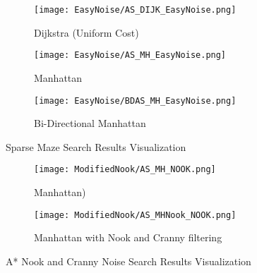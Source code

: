 \documentclass[conference]{IEEEtran}
\begin{document}
\begin{figure*}[h]
    \centering
    \begin{subfigure}{.29\textwidth}
        \texttt{[image: EasyNoise/AS\_DIJK\_EasyNoise.png]}
        \caption{Dijkstra (Uniform Cost)}
        \label{fig:EN_DIJK}
    \end{subfigure} \hfill
    \begin{subfigure}{.29\textwidth}
        \texttt{[image: EasyNoise/AS\_MH\_EasyNoise.png]}
        \caption{Manhattan}
        \label{fig:EN_MH}
    \end{subfigure} \hfill
    \begin{subfigure}{.29\textwidth}
        \texttt{[image: EasyNoise/BDAS\_MH\_EasyNoise.png]}
        \caption{Bi-Directional Manhattan}
        \label{fig:EN_BMH}
    \end{subfigure} \hfill
  
    \caption{Sparse Maze Search Results Visualization}    
    \label{fig:EasyNoise}
\end{figure*}

\begin{figure*}[h]
    \centering
    \begin{subfigure}{.45\textwidth}
        \texttt{[image: ModifiedNook/AS\_MH\_NOOK.png]}
        \caption{Manhattan)}
    \end{subfigure} \hfill
    \begin{subfigure}{.45\textwidth}
        \texttt{[image: ModifiedNook/AS\_MHNook\_NOOK.png]}
        \caption{Manhattan with Nook and Cranny filtering}
    \end{subfigure} \hfill
  
    \caption{A* Nook and Cranny Noise Search Results Visualization}    
    \label{fig:ModNook}
\end{figure*}
\end{document}
